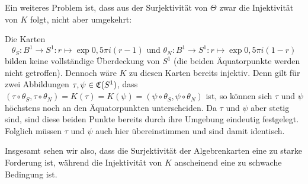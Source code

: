 Ein weiteres Problem ist, dass aus der Surjektivität von $\Theta$ zwar die Injektivität von $K$ folgt, nicht aber umgekehrt:

\begin{bsp}\label{bsp:keine-Ueberdeckung}Die Karten 
	\[\theta_S: B^1 \to S^1: r \mapsto \exp{0,5 \pi i (r-1)} \text{ und } \theta_N: B^1 \to S^1: r \mapsto \exp{0,5 \pi i (1-r)}\]
bilden keine vollständige Überdeckung von $S^1$ (die beiden Äquatorpunkte werden nicht getroffen). Dennoch wäre $K$ zu diesen Karten bereits injektiv. Denn gilt für zwei Abbildungen $\tau, \psi \in \mathfrak{C}(S^1)$, dass $(\tau\circ\theta_S, \tau\circ\theta_N) = K(\tau) = K(\psi) = (\psi\circ\theta_S, \psi\circ\theta_N)$ ist, so können sich $\tau$ und $\psi$ höchstens noch an den Äquatorpunkten unterscheiden. Da $\tau$ und $\psi$ aber stetig sind, sind diese beiden Punkte bereits durch ihre Umgebung eindeutig festgelegt. Folglich müssen $\tau$ und $\psi$ auch hier übereinstimmen und sind damit identisch.
\end{bsp}

Insgesamt sehen wir also, dass die Surjektivität der Algebrenkarten eine zu starke Forderung ist, während die Injektivität von $K$ anscheinend eine zu schwache Bedingung ist. 
